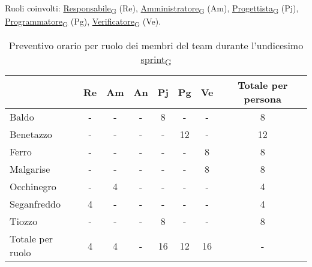 \newpage
{}
Ruoli coinvolti: \href{https://7last.github.io/docs/pb/documentazione-interna/glossario\#responsabile}{Responsabile\textsubscript{G}} (Re), \href{https://7last.github.io/docs/pb/documentazione-interna/glossario\#amministratore}{Amministratore\textsubscript{G}} (Am), \href{https://7last.github.io/docs/pb/documentazione-interna/glossario\#progettista}{Progettista\textsubscript{G}} (Pj), \href{https://7last.github.io/docs/pb/documentazione-interna/glossario\#programmatore}{Programmatore\textsubscript{G}} (Pg), \href{https://7last.github.io/docs/pb/documentazione-interna/glossario\#verificatore}{Verificatore\textsubscript{G}} (Ve).
\begin{table}[!h]
    \centering
    \begin{tabular}{ | l | c | c | c | c | c | c | c | }
        \hline
        \textbf{} & \textbf{Re} & \textbf{Am} &\textbf{An} & \textbf{Pj} & \textbf{Pg} & \textbf{Ve} & \textbf{Totale per persona} \\
        \hline
        Baldo            &  -   &  -   &  -   &  8   &  -   &  -   &  8   \\
        Benetazzo        &  -   &  -   &  -   &  -   & 12   &  -   & 12   \\
        Ferro            &  -   &  -   &  -   &  -   &  -   &  8   &  8   \\
        Malgarise        &  -   &  -   &  -   &  -   &  -   &  8   &  8   \\
        Occhinegro       &  -   &  4   &  -   &  -   &  -   &  -   &  4   \\
        Seganfreddo      &  4   &  -   &  -   &  -   &  -   &  -   &  4   \\
        Tiozzo           &  -   &  -   &  -   &  8   &  -   &  -   &  8   \\
        \hline
        Totale per ruolo &  4   &  4   &  -   & 16   & 12   & 16   &  -   \\
        \hline
    \end{tabular}
    \caption{Preventivo orario per ruolo dei membri del team durante l'undicesimo \href{https://7last.github.io/docs/pb/documentazione-interna/glossario\#sprint}{sprint\textsubscript{G}}}
    
\end{table}

